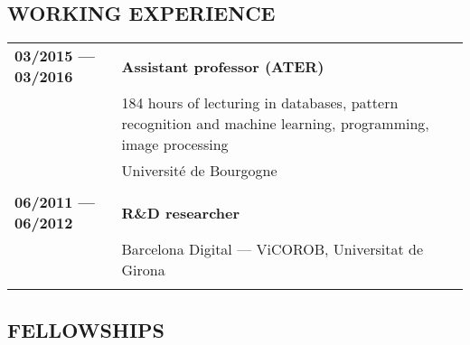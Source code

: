 {\subsection{WORKING EXPERIENCE}

\begin{table}[!h]
\begin{tabular}{p{4cm} p{13cm}}
 \\
\textbf{03/2015 --- 03/2016} & \textbf{Assistant professor (ATER)} \\
& 184 hours of lecturing in databases, pattern recognition and machine learning, programming, image processing \\
& Universit\'e de Bourgogne \\[.5em]  \\
\textbf{06/2011 --- 06/2012} & \textbf{R\&D researcher} \\
& Barcelona Digital --- ViCOROB, Universitat de Girona \\[.5em]  \\
\end{tabular}
\end{table}

\newpage

\subsection{FELLOWSHIPS}

}
